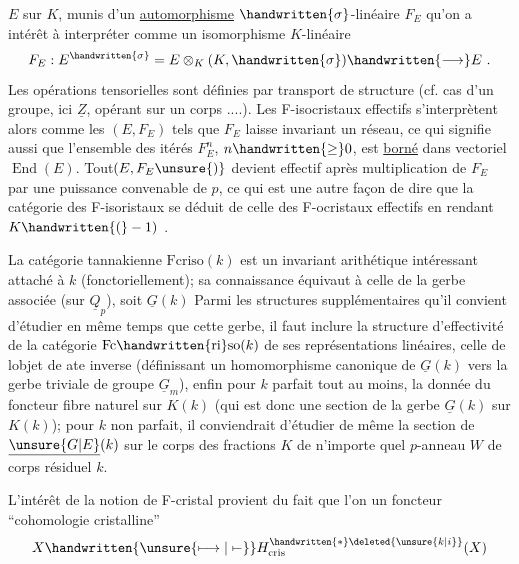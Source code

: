 
$E$ sur $K$, munis d'un  \uline{automorphisme} $\handwritten{\sigma}$-linéaire $F_E$\handwritten{;}  qu'on a intérêt à interpréter comme un isomorphisme $K$-linéaire
\[
F_E : E^{\handwritten{\sigma}} = E\otimes_K(K,\handwritten{\sigma})\handwritten{\longrightarrow} E\ .
\]
Les opérations tensorielles sont définies par transport de structure (cf. cas d'un groupe, ici $\underline{Z}$, opérant sur un corps ....). Les F-isocristaux effectifs s'interprètent alors comme les $(E,F_E)$ tels que $F_E$ laisse invariant un réseau, ce qui signifie aussi que l'ensemble des itérés $F_E^n$, $n\handwritten{\geq}0$, est \uline{borné} dans  vectoriel $\operatorname{End}(E)$. Tout$(E,F_E\unsure{)}$ devient  effectif après multiplication de $F_E$ par une puissance convenable de $p$, ce qui est une autre façon de dire que la catégorie des F-isoristaux se déduit de celle des F-ocristaux effectifs  en rendant  $K\handwritten{(}-1)$ .

 La catégorie tannakienne $\mathrm{Fcriso}(k)$ est un invariant arithétique intéressant attaché à $k$ (fonctoriellement); sa  connaissance équivaut à celle de la gerbe associée (sur $\underline{Q}_p$), soit $\underline{G}(k)$ Parmi les structures supplémentaires qu'il convient d'étudier en même temps que cette gerbe, il faut inclure la structure d'effectivité de la catégorie $\mathrm{Fc}\handwritten{\mathrm{ri}}\mathrm{so}(k)$ de ses représentations linéaires, celle de lobjet de ate inverse (définissant un homomorphisme canonique de $\underline{G}(k)$ vers la gerbe triviale de groupe $\underline{G}_m$), enfin pour $k$ parfait tout au moins, la donnée du foncteur fibre naturel sur $K(k)$ (qui est donc une section de la gerbe $\underline{G}(k)$ sur $K(k)$); pour $k$ non parfait, il conviendrait  d'étudier de même la section de $\underline{\unsure{G|E}}(k)$ sur le corps des fractions $K$ de n'importe quel $p$-anneau $W$ de corps résiduel $k$.

L'intérêt de la notion de F-cristal  provient du fait que l'on  un foncteur ``cohomologie cristalline''
\[
X\handwritten{\unsure{\longmapsto|\mapstochar\relbar}} H^{\handwritten{*}\deleted{\unsure{k|i}}}_{\mathrm{cris}}(X)
\]

